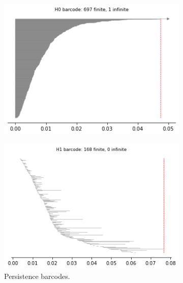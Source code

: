 \begin{figure}[H]
\begin{subfigure}[b]{0.25\textwidth}
\end{subfigure}
\begin{subfigure}[b]{0.24\textwidth}
    \includegraphics[width=\textwidth]{figures/topology/X5_H0_barcode.png}
    \caption{}
\end{subfigure}
\begin{subfigure}[b]{0.24\textwidth}
    \includegraphics[width=\textwidth]{figures/topology/X5_H1_barcode.png}
        \caption{Persistence barcodes.}
\end{subfigure}
\begin{subfigure}[b]{0.24\textwidth}

\end{subfigure}
\end{figure}
